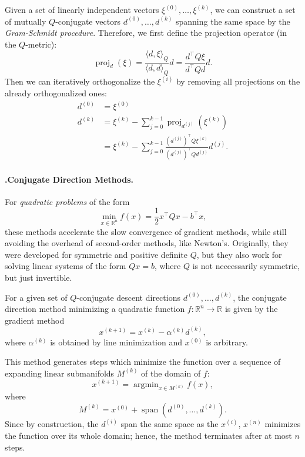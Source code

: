 \documentclass{article}
\newcommand{\RR}{\mathbb{R}}
\newcommand{\T}[1]{#1^{\top}}
\newcommand{\kth}[2][k]{#2^{(#1)}}
\DeclareMathOperator*{\argmin}{arg min}
\DeclareMathOperator{\Span}{span}
\DeclareMathOperator{\proj}{proj}
\newcounter{summary}[section]
\newcommand{\summary}[1]{%
  \paragraph{\arabic{section}.\arabic{summary}\enspace #1.}\refstepcounter{summary}}
\begin{document}
Given a set of linearly independent vectors \(\kth[0]{\xi}, \ldots, \kth{\xi}\), we can construct a
set of mutually \(Q\)-conjugate vectors \(\kth[0]{d}, \ldots, \kth{d}\) spanning the same space by
the \emph{Gram-Schmidt procedure}.  Therefore, we first define the projection operator (in the
\(Q\)-metric):
\begin{equation*}
  \proj_d(\xi) = \frac{\langle d, \xi \rangle_Q}{\langle d, d \rangle_Q} d
  = \frac{\T{d} Q \xi}{\T{d} Q d} d.
\end{equation*}
Then we can iteratively orthogonalize the \(\kth[i]{\xi}\) by removing all projections on the already
orthogonalized ones:
\begin{align*}
  \kth[0]{d} &= \kth[0]{\xi} \\
  \kth[k]{d} &= \kth[k]{\xi} - \sum_{j=0}^{k-1} \proj_{\kth[j]{d}}(\kth[k]{\xi}) \\
             &= \kth[k]{\xi} - \sum_{j=0}^{k-1}
               \frac{\T{(\kth[j]{d})} Q \kth[k]{\xi}}{\T{(\kth[j]{d})} Q \kth[j]{d}} \kth[j]{d}.
\end{align*}


\summary{Conjugate Direction Methods}

For \emph{quadratic problems} of the form
\begin{equation*}
  \min_{x \in \RR^n} f(x) = \frac{1}{2} \T{x}Qx - \T{b}x,
\end{equation*}
these methods accelerate the slow convergence of gradient methods, while still avoiding the overhead
of second-order methods, like Newton's.  Originally, they were developed for symmetric and positive
definite \(Q\), but they also work for solving linear systems of the form \(Qx = b\), where \(Q\) is
not neccessarily symmetric, but just invertible.

For a given set of \(Q\)-conjugate descent directions \(\kth[0]{d}, \ldots, \kth{d}\), the conjugate
direction method minimizing a quadratic function \(f: \RR^n \to \RR\) is given by the gradient
method
\begin{equation*}
  \kth[k+1]{x} = \kth{x} - \kth{\alpha}\kth{d},
\end{equation*}
where \(\kth{\alpha}\) is obtained by line minimization and \(\kth[0]{x}\) is arbitrary.

This method generates steps which minimize the function over a sequence of expanding linear
submanifolds \(\kth{M}\) of the domain of \(f\):
\begin{equation*}
  \kth[k+1]{x} = \argmin_{x \in \kth{M}} f(x),
\end{equation*}
where
\begin{equation*}
  \kth{M} = \kth[0]{x} + \Span (\kth[0]{d}, \ldots, \kth{d}).
\end{equation*}
Since by construction, the \(\kth[i]{d}\) span the same space as the \(\kth[i]{x}\), \(\kth[n]{x}\)
minimizes the function over its whole domain; hence, the method terminates after at most \(n\)
steps.
\end{document}
